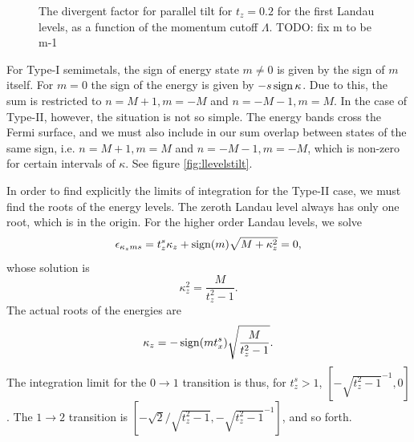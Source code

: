 \begin{figure}[hp]
  \centering
  \caption{The divergent factor for parallel tilt for \( t_z =0.2 \) for the first Landau levels, as a function of the momentum cutoff \( \Lambda \).
    TODO: fix m to be m-1}
  \label{fig:divergent-factor}
\end{figure}
For Type-I semimetals, the sign of energy state \( m \neq 0 \) is given by the sign of \( m \) itself.
For \( m = 0 \) the sign of the energy is given by \( -s \operatorname{sign}{\kappa } \).
Due to this, the sum is restricted to \( n=M+1, m=-M \) and \( n=-M-1, m=M \).
In the case of Type-II, however, the situation is not so simple.
The energy bands cross the Fermi surface, and we must also include in our sum overlap between states of the same sign, i.e. \( n=M+1, m=M \) and \( n=-M-1, m=-M \), which is non-zero for certain intervals of \( \kappa  \).
See figure \ref{fig:llevelstilt}.


In order to find explicitly the limits of integration for the Type-II case, we must find the roots of the energy levels.
The zeroth Landau level always has only one root, which is in the origin.
For the higher order Landau levels, we solve
\begin{equation}
  \label{eq:93}
  \epsilon_{\kappa_z m s } = t_z^s \kappa_z + \operatorname{sign}(m) \sqrt{M + \kappa_{z} ^2} = 0,
\end{equation}
whose solution is
\[
\kappa_z^2 = \frac{M}{t_{z}^2 - 1}.
\]
The actual roots of the energies are
\begin{equation}
  \label{eq:94}
  \kappa_z = -\operatorname{sign}(m t^s_x) \sqrt{\frac{M}{t_{z}^2 - 1}}.
\end{equation}
The integration limit for the \( 0 \to 1 \) transition is thus, for \( t_z^s > 1 \), \( [-\sqrt{t_z^2 - 1 }^{-1}, 0] \).
The \( 1\to 2 \) transition is \( [-\sqrt{2} /\sqrt{t_z^2 - 1}, -\sqrt{t_z^2 - 1 }^{-1}] \), and so forth.

